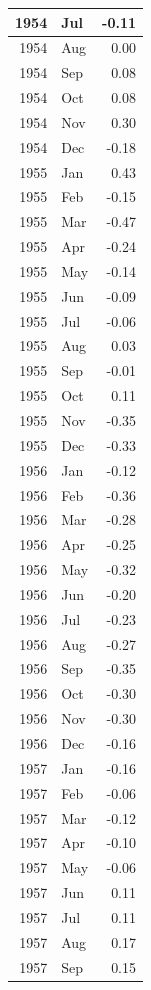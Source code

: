 \documentclass[
]{article}
\begin{document}
\begin{table}[H]
\begin{tabular}[t]{r|l|r}
\hline
1954 & Jul & -0.11\\
\hline
1954 & Aug & 0.00\\
\hline
1954 & Sep & 0.08\\
\hline
1954 & Oct & 0.08\\
\hline
1954 & Nov & 0.30\\
\hline
1954 & Dec & -0.18\\
\hline
1955 & Jan & 0.43\\
\hline
1955 & Feb & -0.15\\
\hline
1955 & Mar & -0.47\\
\hline
1955 & Apr & -0.24\\
\hline
1955 & May & -0.14\\
\hline
1955 & Jun & -0.09\\
\hline
1955 & Jul & -0.06\\
\hline
1955 & Aug & 0.03\\
\hline
1955 & Sep & -0.01\\
\hline
1955 & Oct & 0.11\\
\hline
1955 & Nov & -0.35\\
\hline
1955 & Dec & -0.33\\
\hline
1956 & Jan & -0.12\\
\hline
1956 & Feb & -0.36\\
\hline
1956 & Mar & -0.28\\
\hline
1956 & Apr & -0.25\\
\hline
1956 & May & -0.32\\
\hline
1956 & Jun & -0.20\\
\hline
1956 & Jul & -0.23\\
\hline
1956 & Aug & -0.27\\
\hline
1956 & Sep & -0.35\\
\hline
1956 & Oct & -0.30\\
\hline
1956 & Nov & -0.30\\
\hline
1956 & Dec & -0.16\\
\hline
1957 & Jan & -0.16\\
\hline
1957 & Feb & -0.06\\
\hline
1957 & Mar & -0.12\\
\hline
1957 & Apr & -0.10\\
\hline
1957 & May & -0.06\\
\hline
1957 & Jun & 0.11\\
\hline
1957 & Jul & 0.11\\
\hline
1957 & Aug & 0.17\\
\hline
1957 & Sep & 0.15\\

\end{tabular}
\end{table}
\end{document}

